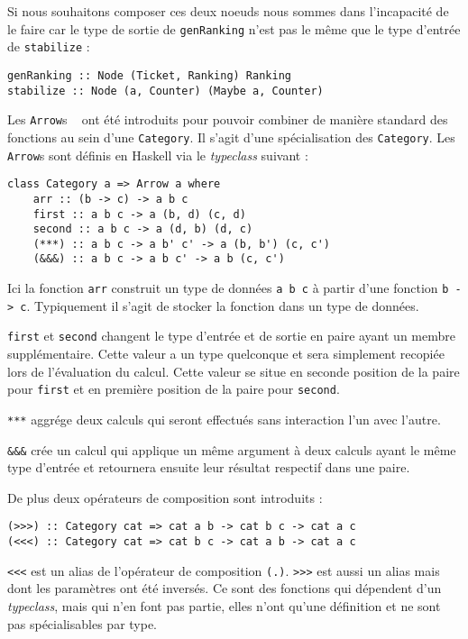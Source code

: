 \documentclass{llncs}
\newcommand{\Arrs}{\lstinline{Arrow}s }
\begin{document}
Si nous souhaitons composer ces deux noeuds nous sommes dans l'incapacité de le
faire car le type de sortie de \lstinline{genRanking} n'est pas le même que le
type d'entrée de \lstinline{stabilize} :
\begin{lstlisting}
genRanking :: Node (Ticket, Ranking) Ranking
stabilize :: Node (a, Counter) (Maybe a, Counter)
\end{lstlisting}

Les \Arrs~\cite{Hughes00} ont été introduits pour pouvoir combiner de manière
standard des fonctions au sein d'une \lstinline{Category}.
Il s'agit d'une spécialisation des \lstinline{Category}.
Les \Arrs sont définis en Haskell via le \emph{typeclass} suivant :
\begin{lstlisting}
class Category a => Arrow a where
    arr :: (b -> c) -> a b c
    first :: a b c -> a (b, d) (c, d)
    second :: a b c -> a (d, b) (d, c)
    (***) :: a b c -> a b' c' -> a (b, b') (c, c')
    (&&&) :: a b c -> a b c' -> a b (c, c')
\end{lstlisting}

Ici la fonction \lstinline{arr} construit un type de données
\lstinline{a b c} à partir d'une fonction \lstinline{b -> c}.
Typiquement il s'agit de stocker la fonction dans un type de données.

\lstinline{first} et \lstinline{second} changent le type d'entrée et de sortie
en paire ayant un membre supplémentaire.
Cette valeur a un type quelconque et sera simplement recopiée lors de l'évaluation
du calcul.
Cette valeur se situe en seconde position de la paire pour \lstinline{first} et en
première position de la paire pour \lstinline{second}.

\lstinline{***} aggrége deux calculs qui seront effectués sans interaction l'un
avec l'autre.

\lstinline{&&&} crée un calcul qui applique un même argument à deux calculs ayant
le même type d'entrée et retournera ensuite leur résultat respectif dans une paire.

De plus deux opérateurs de composition sont introduits :
\begin{lstlisting}
(>>>) :: Category cat => cat a b -> cat b c -> cat a c
(<<<) :: Category cat => cat b c -> cat a b -> cat a c
\end{lstlisting}

\lstinline{<<<} est un alias de l'opérateur de composition \lstinline{(.)}.
\lstinline{>>>} est aussi un alias mais dont les paramètres ont été inversés.
Ce sont des fonctions qui dépendent d'un \emph{typeclass}, mais qui n'en font pas
partie, elles n'ont qu'une définition et ne sont pas spécialisables par type.
\end{document}
